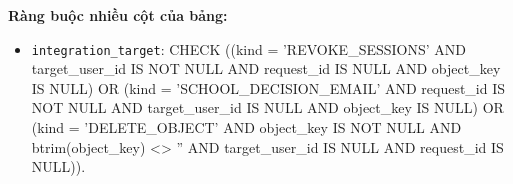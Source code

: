 \textbf{Ràng buộc nhiều cột của bảng:}

\begin{itemize}

\item \texttt{integration\_\allowbreak{}target}: CHECK ((kind = 'REVOKE\_\allowbreak{}SESSIONS' AND target\_\allowbreak{}user\_\allowbreak{}id IS NOT NULL AND request\_\allowbreak{}id IS NULL AND object\_\allowbreak{}key IS NULL) OR (kind = 'SCHOOL\_\allowbreak{}DECISION\_\allowbreak{}EMAIL' AND request\_\allowbreak{}id IS NOT NULL AND target\_\allowbreak{}user\_\allowbreak{}id IS NULL AND object\_\allowbreak{}key IS NULL) OR (kind = 'DELETE\_\allowbreak{}OBJECT' AND object\_\allowbreak{}key IS NOT NULL AND btrim(object\_\allowbreak{}key) <> '' AND target\_\allowbreak{}user\_\allowbreak{}id IS NULL AND request\_\allowbreak{}id IS NULL)).

\end{itemize}
